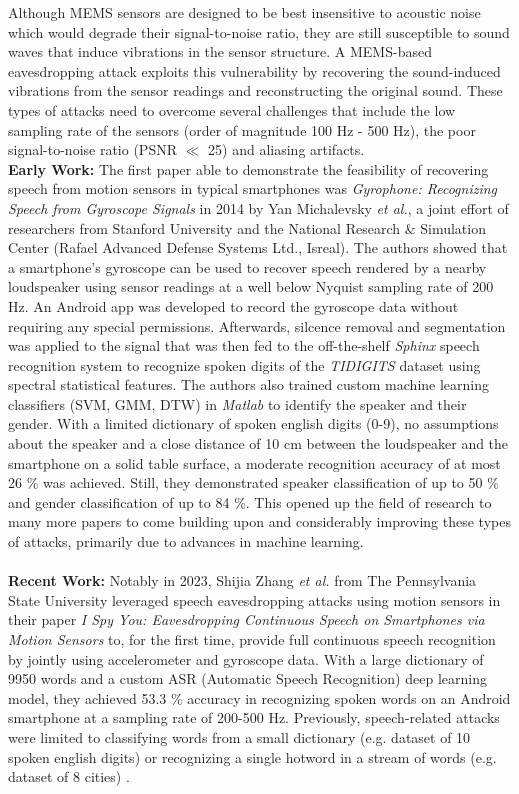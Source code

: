 \documentclass[sigconf, nonacm]{acmart}
\begin{document}
Although MEMS sensors are designed to be best insensitive to acoustic noise which would degrade their signal-to-noise ratio, they are still susceptible to sound waves that induce vibrations in the sensor structure.
A MEMS-based eavesdropping attack exploits this vulnerability by recovering the sound-induced vibrations from the sensor readings and reconstructing the original sound.
These types of attacks need to overcome several challenges that include the low sampling rate of the sensors (order of magnitude 100 Hz - 500 Hz), the poor signal-to-noise ratio (PSNR $\ll$ 25) and aliasing artifacts.
\\[6pt]
\textbf{Early Work:} The first paper able to demonstrate the feasibility of recovering speech from motion sensors in typical smartphones was \textit{Gyrophone: Recognizing Speech from Gyroscope Signals} \cite{Gyrophone2014} in 2014 by Yan Michalevsky \textit{et al.}, a joint effort of researchers from Stanford University and the National Research \& Simulation Center (Rafael Advanced Defense Systems Ltd., Isreal).
The authors showed that a smartphone's gyroscope can be used to recover speech rendered by a nearby loudspeaker using sensor readings at a well below Nyquist sampling rate of 200 Hz.
An Android app was developed to record the gyroscope data without requiring any special permissions.
Afterwards, silcence removal and segmentation was applied to the signal that was then fed to the off-the-shelf \textit{Sphinx} speech recognition system to recognize spoken digits of the \textit{TIDIGITS} dataset using spectral statistical features. The authors also trained custom machine learning classifiers (SVM, GMM, DTW) in \textit{Matlab} to identify the speaker and their gender.
With a limited dictionary of spoken english digits (0-9), no assumptions about the speaker and a close distance of 10 cm between the loudspeaker and the smartphone on a solid table surface, a moderate recognition accuracy of at most 26 \% was achieved. Still, they demonstrated speaker classification of up to 50 \% and gender classification of up to 84 \%.
This opened up the field of research to many more papers to come building upon and considerably improving these types of attacks, primarily due to advances in machine learning.
\\~\\
\textbf{Recent Work:} Notably in 2023, Shijia Zhang \textit{et al.} from The Pennsylvania State University leveraged speech eavesdropping attacks using motion sensors in their paper \textit{I Spy You: Eavesdropping Continuous Speech on Smartphones via Motion Sensors} \cite{ISpyU2023} to, for the first time, provide full continuous speech recognition by jointly using accelerometer and gyroscope data.
With a large dictionary of 9950 words and a custom ASR (Automatic Speech Recognition) deep learning model, they achieved 53.3 \% accuracy in recognizing spoken words on an Android smartphone at a sampling rate of 200-500 Hz.
Previously, speech-related attacks were limited to classifying words from a small dictionary (e.g. dataset of 10 spoken english digits) \cite{Gyrophone2014}\cite{Speechless2018}\cite{InertiEAR2022}\cite{VoiceListener2023} or recognizing a single hotword in a stream of words (e.g. dataset of 8 cities) \cite{AccelWorld2015}\cite{AccelEve2020}\cite{Vibphone2021}.
\end{document}
